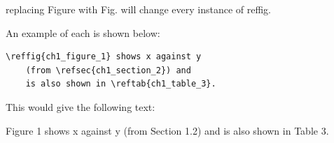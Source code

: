     \noindent \ie replacing Figure with Fig. will change every instance of reffig.

    An example of each is shown below:

    \begin{lstlisting}[style=base]
    \reffig{ch1_figure_1} shows x against y 
    (from \refsec{ch1_section_2}) and 
    is also shown in \reftab{ch1_table_3}.
    \end{lstlisting}

    This would give the following text:

    Figure 1 shows x against y (from Section 1.2) and is also shown in Table 3.